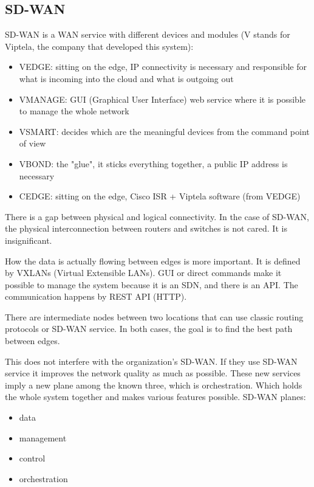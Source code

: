 \documentclass{article}
\begin{document}
\subsection{SD-WAN}
SD-WAN is a WAN service with different devices and modules (V stands for Viptela, the company that developed this system):
\begin{itemize}
    \item VEDGE: sitting on the edge, IP connectivity is necessary and responsible for what is incoming into the cloud and what is outgoing out
    \item VMANAGE: GUI (Graphical User Interface) web service where it is possible to manage the whole network
    \item VSMART: decides which are the meaningful devices from the command point of view
    \item VBOND: the "glue", it sticks everything together, a public IP address is necessary
    \item CEDGE: sitting on the edge, Cisco ISR + Viptela software (from VEDGE)
\end{itemize}

There is a gap between physical and logical connectivity. In the case of SD-WAN, the physical interconnection between routers and switches is not cared. It is insignificant.

How the data is actually flowing between edges is more important. It is defined by VXLANs (Virtual Extensible LANs). GUI or direct commands make it possible to manage the system because it is an SDN, and there is an API. The communication happens by REST API (HTTP).

There are intermediate nodes between two locations that can use classic routing protocols or SD-WAN service. In both cases, the goal is to find the best path between edges.

This does not interfere with the organization's SD-WAN. If they use SD-WAN service it improves the network quality as much as possible. These new services imply a new plane among the known three, which is orchestration. Which holds the whole system together and makes various features possible. SD-WAN planes:
\begin{itemize}
    \item data
    \item management
    \item control
    \item orchestration
\end{itemize}
\end{document}
